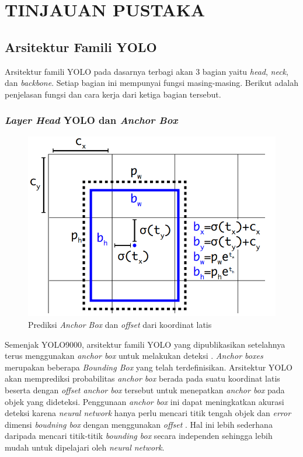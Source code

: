 \section{TINJAUAN PUSTAKA}
\subsection{Arsitektur Famili YOLO}
  Arsitektur famili YOLO pada dasarnya terbagi akan 3 bagian yaitu \emph{head}, \emph{neck}, dan \emph{backbone}.
  Setiap bagian ini mempunyai fungsi masing-masing.
  Berikut adalah penjelasan fungsi dan cara kerja dari ketiga bagian tersebut.
  \subsubsection{\emph{Layer Head} YOLO dan \emph{Anchor Box}}
    \begin{figure}[ht]
        \centering
        \includegraphics[scale=0.4]{pictures/anchorbox.png}
        \caption{Prediksi \emph{Anchor Box} dan \emph{offset} dari koordinat latis \parencite{yolov3}}
        \label{fig:anchorbox}
    \end{figure}
    Semenjak YOLO9000, arsitektur famili YOLO yang dipublikasikan setelahnya terus menggunakan \emph{anchor box} untuk melakukan deteksi \parencites{yolov2}{yolov3}{yolov4}{scaledyolov4}{yolov5}{yolor}{yolov7}.
    \emph{Anchor boxes} merupakan beberapa \emph{Bounding Box} yang telah terdefinisikan. 
    Arsitektur YOLO akan memprediksi probabilitas \emph{anchor box} berada pada suatu koordinat latis beserta dengan \emph{offset anchor box} tersebut untuk menepatkan \emph{anchor box} pada objek yang dideteksi.
    Penggunaan \emph{anchor box} ini dapat meningkatkan akurasi deteksi karena \emph{neural network} hanya perlu mencari titik tengah objek dan \emph{error} dimensi \emph{boudning box} dengan menggunakan \emph{offset} \parencite{yolov3}.
    Hal ini lebih sederhana daripada mencari titik-titik \emph{bounding box} secara independen sehingga lebih mudah untuk dipelajari oleh \emph{neural network}.

